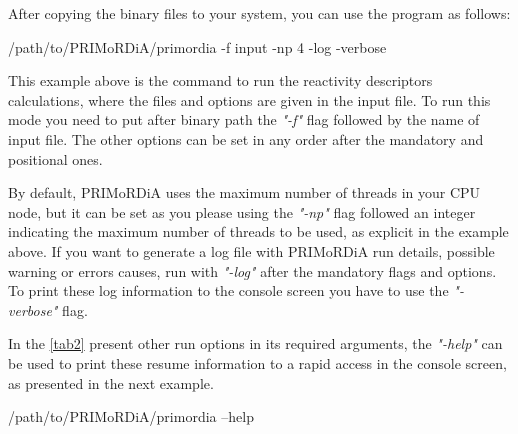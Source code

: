 \documentclass[a4paper,11pt]{refart}
\begin{document}
After copying the binary files to your system, you can use the program as follows:

\hspace*{-\leftmarginwidth}
\begin{minipage}{\fullwidth}
\begin{commandshell}
/path/to/PRIMoRDiA/primordia -f input -np 4 -log -verbose 	
\end{commandshell}
\end{minipage}

This example above is the command to run the reactivity descriptors calculations, where the files and options are given in the input file. To run this mode you need to put after binary path  the \emph{"-f"} flag followed by the name of input file. The other options can be set in any order after the mandatory and positional ones. 

By default, PRIMoRDiA uses the maximum number of threads in your CPU node, but it can be set as you please using the \emph{"-np"} flag followed an integer indicating the maximum number of threads to be used, as explicit in the example above. If you want to generate a log file with PRIMoRDiA run details, possible warning or errors causes, run with \emph{"-log"} after the mandatory flags and options. To print these log information to the console screen you have to use the \emph{"-verbose"} flag. 

In the \autoref{tab2} present  other run options in its required arguments, the \emph{"-help"} can be used to print these resume information to a rapid access in the console screen, as presented in the next example.

\hspace*{-\leftmarginwidth}
\begin{minipage}{\fullwidth}
\begin{commandshell}
/path/to/PRIMoRDiA/primordia --help
\end{commandshell}
\end{minipage}
\end{document}
